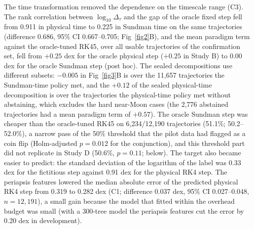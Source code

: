\documentclass[10pt,letterpaper]{article}
\begin{document}
The time transformation removed the dependence on the timescale range (C3). The rank correlation between $\log_{10}\Delta_{\tau}$ and the gap of the oracle fixed step fell from 0.911 in physical time to 0.225 in Sundman time on the same trajectories (difference 0.686, 95\% CI 0.667--0.705; Fig~\ref{fig2}B), and the mean paradigm term against the oracle-tuned RK45, over all usable trajectories of the confirmation set, fell from $+0.25$ dex for the oracle physical step ($+0.25$ in Study B) to 0.00 dex for the oracle Sundman step (post hoc). The sealed decompositions use different subsets: $-0.005$ in Fig~\ref{fig3}B is over the 11,657 trajectories the Sundman-time policy met, and the $+0.12$ of the sealed physical-time decomposition is over the trajectories the physical-time policy met without abstaining, which excludes the hard near-Moon cases (the 2,776 abstained trajectories had a mean paradigm term of $+0.57$). The oracle Sundman step was cheaper than the oracle-tuned RK45 on 6,234/12,190 trajectories (51.1\%; 50.2--52.0\%), a narrow pass of the 50\% threshold that the pilot data had flagged as a coin flip (Holm-adjusted $p = 0.012$ for the conjunction), and this threshold part did not replicate in Study D (50.6\%, $p = 0.11$; below). The target also became easier to predict: the standard deviation of the logarithm of the label was 0.33 dex for the fictitious step against 0.91 dex for the physical RK4 step. The periapsis features lowered the median absolute error of the predicted physical RK4 step from 0.319 to 0.282 dex (C1; difference 0.037 dex, 95\% CI 0.027--0.048, $n = 12,191$), a small gain because the model that fitted within the overhead budget was small (with a 300-tree model the periapsis features cut the error by 0.20 dex in development).
\end{document}
